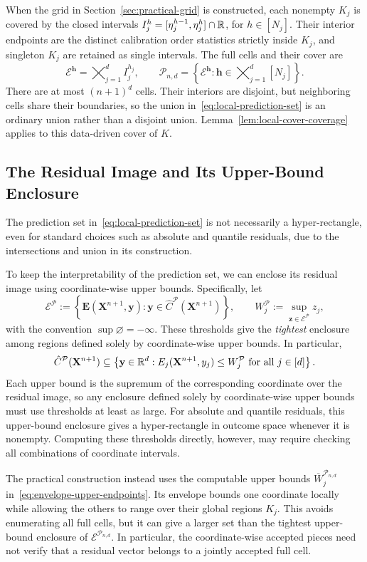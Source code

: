 {When the grid in Section~\ref{sec:practical-grid} is constructed, each nonempty $K_j$ is covered by the closed intervals $I_j^h=[\eta_j^{h-1},\eta_j^h]\cap\mathbb{R}$, for $h\in[N_j]$. Their interior endpoints are the distinct calibration order statistics strictly inside $K_j$, and singleton $K_j$ are retained as single intervals. The full cells and their cover are
\[
\mathcal E^{\mathbf h}=\bigtimes_{j=1}^d I_j^{h_j},
\qquad
\mathcal P_{n,d}
=\left\{\mathcal E^{\mathbf h}:
\mathbf h\in\bigtimes_{j=1}^d[N_j]\right\}.
\]
There are at most $(n+1)^d$ cells. Their interiors are disjoint, but neighboring cells share their boundaries, so the union in~\eqref{eq:local-prediction-set} is an ordinary union rather than a disjoint union. Lemma~\ref{lem:local-cover-coverage} applies to this data-driven cover of $K$.

\subsection{The Residual Image and Its Upper-Bound Enclosure}\label{app:union-enclosure}

The prediction set in~\eqref{eq:local-prediction-set} is not necessarily a hyper-rectangle, even for standard choices such as absolute and quantile residuals, due to the intersections and union in its construction.

To keep the interpretability of the prediction set, we can enclose its residual image using coordinate-wise upper bounds. Specifically, let
\[
\mathcal E^{\mathcal P}
:=\left\{\mathbf E(\mathbf X^{n+1},\mathbf y):
\mathbf y\in\hat C^{\mathcal P}(\mathbf X^{n+1})\right\},
\qquad
W_j^{\mathcal P}:=\sup_{\mathbf z\in\mathcal E^{\mathcal P}}z_j,
\]
with the convention $\sup\varnothing=-\infty$. These thresholds give the \emph{tightest} enclosure among regions defined solely by coordinate-wise upper bounds. In particular,
\[
\hat C^{\mathcal P}(\mathbf X^{n+1})
\subseteq
\left\{\mathbf y\in\mathbb{R}^d:
E_j(\mathbf X^{n+1},y_j)\leq W_j^{\mathcal P}
\text{ for all }j\in[d]\right\}.
\]
Each upper bound is the supremum of the corresponding coordinate over the residual image, so any enclosure defined solely by coordinate-wise upper bounds must use thresholds at least as large. For absolute and quantile residuals, this upper-bound enclosure gives a hyper-rectangle in outcome space whenever it is nonempty. Computing these thresholds directly, however, may require checking all combinations of coordinate intervals.

The practical construction instead uses the computable upper bounds $\overline W_j^{\mathcal P_{n,d}}$ in~\eqref{eq:envelope-upper-endpoints}. Its envelope bounds one coordinate locally while allowing the others to range over their global regions $K_j$. This avoids enumerating all full cells, but it can give a larger set than the tightest upper-bound enclosure of $\mathcal E^{\mathcal P_{n,d}}$. In particular, the coordinate-wise accepted pieces need not verify that a residual vector belongs to a jointly accepted full cell.

}
